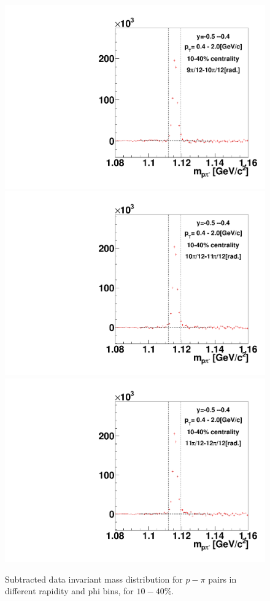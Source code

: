\begin{figure}[h]
\includegraphics[width=0.14\linewidth]{chapterX/fig/ld_v1_sig/kf_ptslice0_cent1_ld_flow_phi10_rap9.pdf}
\includegraphics[width=0.14\linewidth]{chapterX/fig/ld_v1_sig/kf_ptslice0_cent1_ld_flow_phi11_rap9.pdf}
\includegraphics[width=0.14\linewidth]{chapterX/fig/ld_v1_sig/kf_ptslice0_cent1_ld_flow_phi12_rap9.pdf}

\caption{Subtracted data invariant mass distribution for $p-\pi$ pairs in different rapidity and phi bins, for $10-40\%$.}
\label{ld_v1_sig}
\end{figure}

